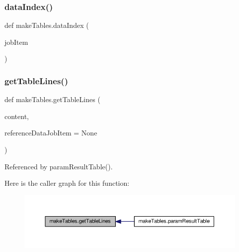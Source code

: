 \mbox{\label{namespacemakeTables_a517bb45e1e7d60d121454c28f132a5bc}} 
\subsubsection{\texorpdfstring{data\+Index()}{dataIndex()}}
{\footnotesize\ttfamily def make\+Tables.\+data\+Index (\begin{DoxyParamCaption}\item[{}]{job\+Item }\end{DoxyParamCaption})}

\mbox{\label{namespacemakeTables_a2969b9894fd7dee3f707de33c3c6d3ca}} 
\subsubsection{\texorpdfstring{get\+Table\+Lines()}{getTableLines()}}
{\footnotesize\ttfamily def make\+Tables.\+get\+Table\+Lines (\begin{DoxyParamCaption}\item[{}]{content,  }\item[{}]{reference\+Data\+Job\+Item = {\ttfamily None} }\end{DoxyParamCaption})}



Referenced by param\+Result\+Table().

Here is the caller graph for this function\+:
\nopagebreak
\begin{figure}[H]
\begin{center}
\leavevmode
\includegraphics[width=350pt]{namespacemakeTables_a2969b9894fd7dee3f707de33c3c6d3ca_icgraph}
\end{center}
\end{figure}
\mbox{\label{namespacemakeTables_a05676f114347275725afdc58dc3656ff}} 
